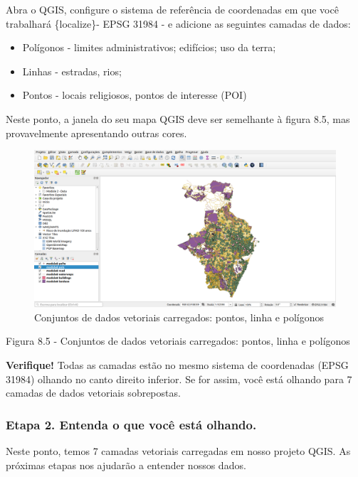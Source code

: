 \documentclass[
]{book}
\providecommand{\tightlist}{%
  \setlength{\itemsep}{0pt}\setlength{\parskip}{0pt}}
\begin{document}
Abra o QGIS, configure o sistema de referência de coordenadas em que você trabalhará \{localize\}- EPSG 31984 - e adicione as seguintes camadas de dados:

\begin{itemize}
\tightlist
\item
  Polígonos - limites administrativos; edifícios; uso da terra;
\item
  Linhas - estradas, rios;
\item
  Pontos - locais religiosos, pontos de interesse (POI)
\end{itemize}

Neste ponto, a janela do seu mapa QGIS deve ser semelhante à figura 8.5, mas provavelmente apresentando outras cores.

\begin{figure}
\centering
\includegraphics{media/modulo8/fig85.png}
\caption{Conjuntos de dados vetoriais carregados: pontos, linha e polígonos}
\end{figure}

Figura 8.5 - Conjuntos de dados vetoriais carregados: pontos, linha e polígonos

\textbf{Verifique!} Todas as camadas estão no mesmo sistema de coordenadas (EPSG 31984) olhando no canto direito inferior. Se for assim, você está olhando para 7 camadas de dados vetoriais sobrepostas.

\hypertarget{etapa-2.-entenda-o-que-vocuxea-estuxe1-olhando.}{%
\subsubsection{\texorpdfstring{\textbf{Etapa 2. Entenda o que você está olhando.}}{Etapa 2. Entenda o que você está olhando.}}\label{etapa-2.-entenda-o-que-vocuxea-estuxe1-olhando.}}

Neste ponto, temos 7 camadas vetoriais carregadas em nosso projeto QGIS. As próximas etapas nos ajudarão a entender nossos dados.
\end{document}

